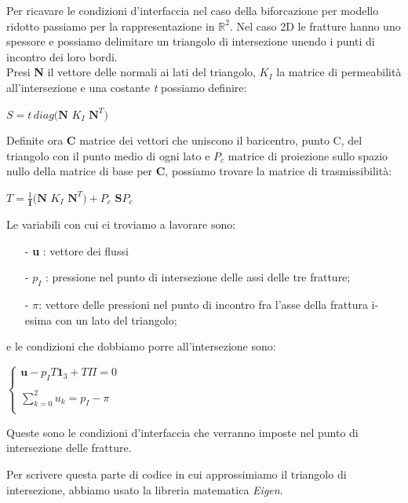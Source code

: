 Per ricavare le condizioni d'interfaccia nel caso della biforcazione per modello ridotto passiamo per la rappresentazione in $\mathbb{R}^{2}$.
Nel caso 2D le fratture hanno uno spessore e possiamo delimitare un triangolo di intersezione unendo i punti di incontro dei loro bordi. \\
Presi \textbf{N} il vettore delle normali ai lati del triangolo, \textbf{$K_{I}$} la matrice di permeabilit\`{a} all'intersezione e una costante \textit{t} possiamo definire:
\begin{center}
	$ S = \textit{t} \, diag( \textbf{N}$ \textbf{$K_{I}$} $ \textbf{N}^{T} ) $
\end{center}
Definite ora \textbf{C} matrice dei vettori che uniscono il baricentro, punto C, del triangolo con il punto medio  di ogni lato e \textbf{$P_{c}$} matrice di proiezione sullo spazio nullo della matrice di base per \textbf{C}, possiamo trovare la matrice di trasmissibilit\`{a}:
\begin{center}
	$ T = \frac{1}{\textbf{I}}( \textbf{N}$ \textbf{$K_{I}$} $ \textbf{N}^{T} ) + $\textbf{$P_{c}$} $\textbf{S}$\textbf{$P_{c}$}
\end{center}
Le variabili con cui ci troviamo a lavorare sono:
	\begin{enumerate}
	\item[-] \textbf{u} : vettore dei flussi
	\item[-] $p_{I}$ :  pressione nel punto di intersezione delle assi delle tre fratture;
	\item[-] \textbf{$\pi$}: vettore delle pressioni nel punto di incontro fra l'asse della frattura i-esima con un lato del triangolo;
	\end{enumerate} 
e le condizioni che dobbiamo porre all'intersezione sono:
\begin{center}			
	$\left \{
		\begin{array}{l}	
	 		\textbf{u} - p_{I}T\textbf{1}_{3}+T\Pi=0  \\ \\
     	 	\sum_{k=0}^2 u_{k} = p_{I} - \pi  \\
		\end{array}
	\right.$
\end{center} \label{condizioniinterfaccia}

\noindent  Queste sono le condizioni d'interfaccia che verranno imposte nel punto di intersezione delle fratture. \\
\par Per scrivere questa parte di codice in cui approssimiamo il triangolo di intersezione, abbiamo usato la libreria matematica \textit{Eigen}.

